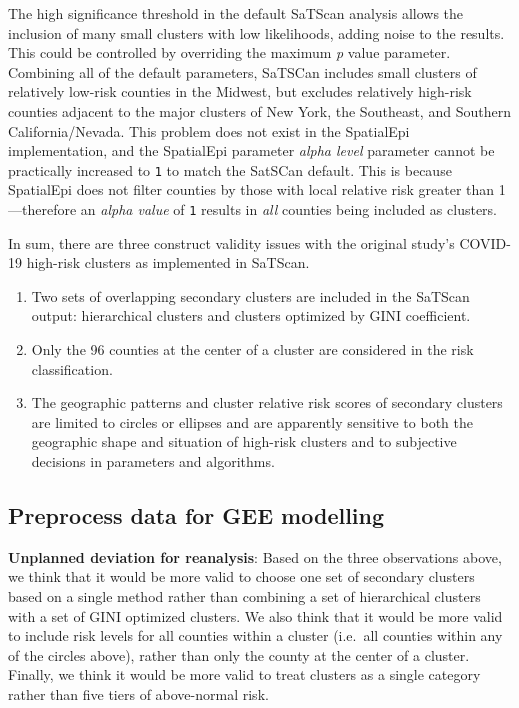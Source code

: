 \documentclass[
]{article}
\providecommand{\tightlist}{%
  \setlength{\itemsep}{0pt}\setlength{\parskip}{0pt}}
\begin{document}
The high significance threshold in the default SaTScan analysis allows
the inclusion of many small clusters with low likelihoods, adding noise
to the results. This could be controlled by overriding the maximum
\emph{p} value parameter. Combining all of the default parameters,
SaTSCan includes small clusters of relatively low-risk counties in the
Midwest, but excludes relatively high-risk counties adjacent to the
major clusters of New York, the Southeast, and Southern
California/Nevada. This problem does not exist in the SpatialEpi
implementation, and the SpatialEpi parameter \emph{alpha level}
parameter cannot be practically increased to \texttt{1} to match the
SatSCan default. This is because SpatialEpi does not filter counties by
those with local relative risk greater than 1---therefore an \emph{alpha
value} of \texttt{1} results in \emph{all} counties being included as
clusters.

In sum, there are three construct validity issues with the original
study's COVID-19 high-risk clusters as implemented in SaTScan.

\begin{enumerate}
\def\labelenumi{\arabic{enumi}.}
\tightlist
\item
  Two sets of overlapping secondary clusters are included in the SaTScan
  output: hierarchical clusters and clusters optimized by GINI
  coefficient.
\item
  Only the 96 counties at the center of a cluster are considered in the
  risk classification.
\item
  The geographic patterns and cluster relative risk scores of secondary
  clusters are limited to circles or ellipses and are apparently
  sensitive to both the geographic shape and situation of high-risk
  clusters and to subjective decisions in parameters and algorithms.
\end{enumerate}

\hypertarget{preprocess-data-for-gee-modelling}{%
\subsection{Preprocess data for GEE
modelling}\label{preprocess-data-for-gee-modelling}}

\textbf{Unplanned deviation for reanalysis}: Based on the three
observations above, we think that it would be more valid to choose one
set of secondary clusters based on a single method rather than combining
a set of hierarchical clusters with a set of GINI optimized clusters. We
also think that it would be more valid to include risk levels for all
counties within a cluster (i.e.~all counties within any of the circles
above), rather than only the county at the center of a cluster. Finally,
we think it would be more valid to treat clusters as a single category
rather than five tiers of above-normal risk.
\end{document}
